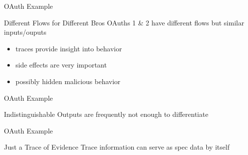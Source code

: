 \begin{frame}{OAuth Example}
  \begin{block}{Different Flows for Different Bros}
    OAuths 1 \& 2 have different flows but similar inputs/ouputs

    \begin{itemize}
      \item traces provide insight into behavior
      \item side effects are very important
      \item possibly hidden malicious behavior
    \end{itemize}
  \end{block}
\end{frame}

\begin{frame}{OAuth Example}
  \begin{block}{Indistinguishable}
    Outputs are frequently not enough to differentiate

    \begin{example}
      
    \end{example}
  \end{block}
\end{frame}

\begin{frame}{OAuth Example}
  \begin{block}{Just a Trace of Evidence}
    Trace information can serve as spec data by itself

    \begin{example}
      
    \end{example}
  \end{block}
\end{frame}
